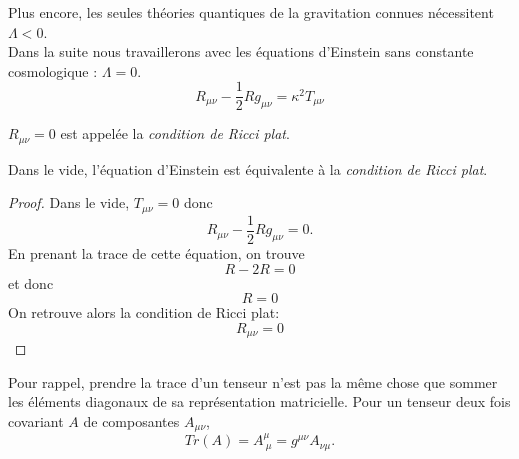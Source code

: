 \documentclass[a4paper,11pt]{report}
\begin{document}
            Plus encore, les seules théories quantiques de la gravitation connues nécessitent $\Lambda<0$.\\
            
            Dans la suite nous travaillerons avec les équations d'Einstein sans constante cosmologique : $\Lambda = 0$.
            \begin{equation}
                R_{\mu\nu}-\frac{1}{2}Rg_{\mu\nu} = \kappa^2 T_{\mu\nu}
            \end{equation}
            
            \begin{defn}
                $R_{\mu\nu} = 0$ est appelée la \textit{condition de Ricci plat}.
            \end{defn}
            
            \begin{prop}\begin{leftbar}
                Dans le vide, l'équation d'Einstein est équivalente à la \textit{condition de Ricci plat}.
            \end{leftbar}\end{prop}
            
            \begin{proof}
                Dans le vide, $T_{\mu\nu}=0$ donc
                \begin{equation}
                    R_{\mu\nu}-\frac{1}{2}Rg_{\mu\nu} = 0.
                \end{equation}
                En prenant la trace de cette équation, on trouve
                \begin{equation}
                    R-2R = 0
                \end{equation}
                et donc
                \begin{equation}
                    R = 0
                \end{equation}
                On retrouve alors la condition de Ricci plat:
                \begin{equation}
                    R_{\mu\nu} = 0
                \end{equation}
            \end{proof}
            Pour rappel, prendre la trace d'un tenseur n'est pas la même chose que sommer les éléments diagonaux de sa représentation matricielle. Pour un tenseur deux fois covariant $A$ de composantes $A_{\mu\nu}$, 
            \begin{equation}
                Tr(A) = A^\mu_{~\mu} = g^{\mu\nu}A_{\nu\mu}.
            \end{equation}
            
\end{document}
